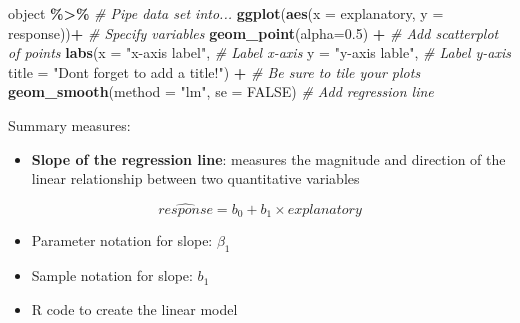 \documentclass[
]{report}
\newenvironment{Shaded}{\begin{snugshade}}{\end{snugshade}}
\newcommand{\AttributeTok}[1]{\textcolor[rgb]{0.13,0.29,0.53}{#1}}
\newcommand{\CommentTok}[1]{\textcolor[rgb]{0.56,0.35,0.01}{\textit{#1}}}
\newcommand{\ConstantTok}[1]{\textcolor[rgb]{0.56,0.35,0.01}{#1}}
\newcommand{\DecValTok}[1]{\textcolor[rgb]{0.00,0.00,0.81}{#1}}
\newcommand{\FloatTok}[1]{\textcolor[rgb]{0.00,0.00,0.81}{#1}}
\newcommand{\FunctionTok}[1]{\textcolor[rgb]{0.13,0.29,0.53}{\textbf{#1}}}
\newcommand{\NormalTok}[1]{#1}
\newcommand{\OtherTok}[1]{\textcolor[rgb]{0.56,0.35,0.01}{#1}}
\newcommand{\SpecialCharTok}[1]{\textcolor[rgb]{0.81,0.36,0.00}{\textbf{#1}}}
\newcommand{\StringTok}[1]{\textcolor[rgb]{0.31,0.60,0.02}{#1}}
\providecommand{\tightlist}{%
  \setlength{\itemsep}{0pt}\setlength{\parskip}{0pt}}
\begin{document}
\begin{Shaded}
\begin{Highlighting}[]
\NormalTok{object }\SpecialCharTok{\%\textgreater{}\%} \CommentTok{\# Pipe data set into...}
\FunctionTok{ggplot}\NormalTok{(}\FunctionTok{aes}\NormalTok{(}\AttributeTok{x =}\NormalTok{ explanatory, }\AttributeTok{y =}\NormalTok{ response))}\SpecialCharTok{+}  \CommentTok{\# Specify variables}
  \FunctionTok{geom\_point}\NormalTok{(}\AttributeTok{alpha=}\FloatTok{0.5}\NormalTok{) }\SpecialCharTok{+}  \CommentTok{\# Add scatterplot of points}
  \FunctionTok{labs}\NormalTok{(}\AttributeTok{x =} \StringTok{"x{-}axis label"}\NormalTok{,  }\CommentTok{\# Label x{-}axis}
       \AttributeTok{y =} \StringTok{"y{-}axis lable"}\NormalTok{,  }\CommentTok{\# Label y{-}axis}
       \AttributeTok{title =} \StringTok{"Don\textquotesingle{}t forget to add a title!"}\NormalTok{) }\SpecialCharTok{+} 
               \CommentTok{\# Be sure to tile your plots}
  \FunctionTok{geom\_smooth}\NormalTok{(}\AttributeTok{method =} \StringTok{"lm"}\NormalTok{, }\AttributeTok{se =} \ConstantTok{FALSE}\NormalTok{)  }\CommentTok{\# Add regression line}
\end{Highlighting}
\end{Shaded}

Summary measures:

\begin{itemize}
\tightlist
\item
  \textbf{Slope of the regression line}: measures the magnitude and direction of the linear relationship between two quantitative variables
\end{itemize}

\[\widehat{response} = b_0 + b_1 \times explanatory\]
\vspace{1mm}

\begin{itemize}
\item
  Parameter notation for slope: \(\beta_1\)
\item
  Sample notation for slope: \(b_1\)
\item
  R code to create the linear model
\end{itemize}

\begin{Shaded}
\end{Shaded}
\end{document}
